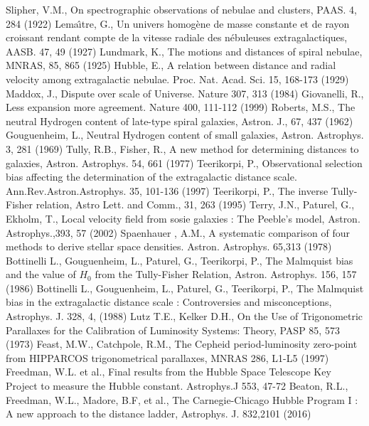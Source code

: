 \begin{thebibliography}{}
Slipher, V.M., On spectrographic observations of nebulae and clusters, PAAS. 4, 284 (1922)
Lema\^{\i}tre, G., Un univers homog\`{e}ne de masse constante et de rayon croissant rendant compte de la vitesse radiale des n\'{e}buleuses extragalactiques, AASB. 47, 49 (1927)
Lundmark, K., The motions and distances of spiral nebulae, MNRAS, 85, 865 (1925)
Hubble, E.,  A relation between distance and radial velocity among extragalactic nebulae. Proc. Nat. Acad. Sci. 15, 168-173 (1929)
Maddox, J.,  Dispute over scale of Universe. Nature 307, 313 (1984)
Giovanelli, R.,  Less expansion more agreement. Nature 400, 111-112 (1999)
Roberts, M.S., The neutral Hydrogen content of late-type spiral galaxies, Astron. J., 67, 437 (1962)
Gouguenheim, L., Neutral Hydrogen content of small galaxies, Astron. Astrophys. 3, 281 (1969)
Tully, R.B., Fisher, R., A new method for determining distances to galaxies, Astron. Astrophys. 54, 661 (1977)
Teerikorpi, P.,  Observational selection bias affecting the determination of the extragalactic distance scale. Ann.Rev.Astron.Astrophys. 35, 101-136 (1997)
Teerikorpi, P.,  The inverse Tully-Fisher relation, Astro Lett. and Comm., 31, 263 (1995)
Terry, J.N.,  Paturel, G., Ekholm, T., Local velocity field from sosie galaxies : The Peeble's model, Astron. Astrophys.,393, 57 (2002) 
 Spaenhauer , A.M., A systematic comparison of four methods to derive stellar space densities. Astron. Astrophys. 65,313 (1978)
Bottinelli L., Gouguenheim, L., Paturel, G., Teerikorpi, P., The Malmquist bias and the value of $H_0$ from the Tully-Fisher Relation, Astron. Astrophys. 156, 157 (1986)
Bottinelli L., Gouguenheim, L., Paturel, G., Teerikorpi, P., The Malmquist bias in the extragalactic distance scale : Controversies and misconceptions, Astrophys. J. 328, 4, (1988)
Lutz T.E., Kelker D.H., On the Use of Trigonometric Parallaxes for the Calibration of Luminosity Systems: Theory, PASP 85, 573 (1973)
Feast, M.W., Catchpole, R.M., The Cepheid period-luminosity zero-point from HIPPARCOS trigonometrical parallaxes, MNRAS 286, L1-L5 (1997)
Freedman, W.L. et al., Final results from the Hubble Space Telescope Key Project to measure the Hubble constant. Astrophys.J 553, 47-72
Beaton, R.L., Freedman, W.L., Madore, B.F, et al., The Carnegie-Chicago Hubble Program I : A new approach to the distance ladder, Astrophys. J. 832,2101 (2016)

\end{thebibliography}
